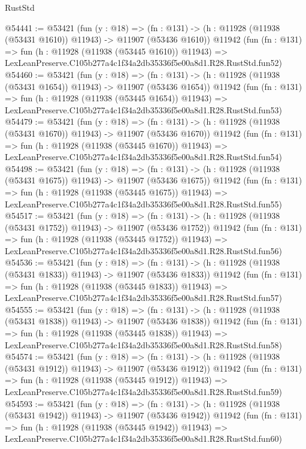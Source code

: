 \begin{lexlean}{RustStd}
\begin{coremodule}
@54441 := @53421
    (fun (y : @18) =>
    (fn : @131) -> (h : @11928 (@11938 (@53431 @1610)) @11943) -> @11907 (@53436 @1610))
    @11942
    (fun (fn : @131) =>
    fun (h : @11928 (@11938 (@53445 @1610)) @11943) =>
    LexLeanPreserve.C105b277a4c1f34a2db35336f5e00a8d1.R28.RustStd.fun52)
@54460 := @53421
    (fun (y : @18) =>
    (fn : @131) -> (h : @11928 (@11938 (@53431 @1654)) @11943) -> @11907 (@53436 @1654))
    @11942
    (fun (fn : @131) =>
    fun (h : @11928 (@11938 (@53445 @1654)) @11943) =>
    LexLeanPreserve.C105b277a4c1f34a2db35336f5e00a8d1.R28.RustStd.fun53)
@54479 := @53421
    (fun (y : @18) =>
    (fn : @131) -> (h : @11928 (@11938 (@53431 @1670)) @11943) -> @11907 (@53436 @1670))
    @11942
    (fun (fn : @131) =>
    fun (h : @11928 (@11938 (@53445 @1670)) @11943) =>
    LexLeanPreserve.C105b277a4c1f34a2db35336f5e00a8d1.R28.RustStd.fun54)
@54498 := @53421
    (fun (y : @18) =>
    (fn : @131) -> (h : @11928 (@11938 (@53431 @1675)) @11943) -> @11907 (@53436 @1675))
    @11942
    (fun (fn : @131) =>
    fun (h : @11928 (@11938 (@53445 @1675)) @11943) =>
    LexLeanPreserve.C105b277a4c1f34a2db35336f5e00a8d1.R28.RustStd.fun55)
@54517 := @53421
    (fun (y : @18) =>
    (fn : @131) -> (h : @11928 (@11938 (@53431 @1752)) @11943) -> @11907 (@53436 @1752))
    @11942
    (fun (fn : @131) =>
    fun (h : @11928 (@11938 (@53445 @1752)) @11943) =>
    LexLeanPreserve.C105b277a4c1f34a2db35336f5e00a8d1.R28.RustStd.fun56)
@54536 := @53421
    (fun (y : @18) =>
    (fn : @131) -> (h : @11928 (@11938 (@53431 @1833)) @11943) -> @11907 (@53436 @1833))
    @11942
    (fun (fn : @131) =>
    fun (h : @11928 (@11938 (@53445 @1833)) @11943) =>
    LexLeanPreserve.C105b277a4c1f34a2db35336f5e00a8d1.R28.RustStd.fun57)
@54555 := @53421
    (fun (y : @18) =>
    (fn : @131) -> (h : @11928 (@11938 (@53431 @1838)) @11943) -> @11907 (@53436 @1838))
    @11942
    (fun (fn : @131) =>
    fun (h : @11928 (@11938 (@53445 @1838)) @11943) =>
    LexLeanPreserve.C105b277a4c1f34a2db35336f5e00a8d1.R28.RustStd.fun58)
@54574 := @53421
    (fun (y : @18) =>
    (fn : @131) -> (h : @11928 (@11938 (@53431 @1912)) @11943) -> @11907 (@53436 @1912))
    @11942
    (fun (fn : @131) =>
    fun (h : @11928 (@11938 (@53445 @1912)) @11943) =>
    LexLeanPreserve.C105b277a4c1f34a2db35336f5e00a8d1.R28.RustStd.fun59)
@54593 := @53421
    (fun (y : @18) =>
    (fn : @131) -> (h : @11928 (@11938 (@53431 @1942)) @11943) -> @11907 (@53436 @1942))
    @11942
    (fun (fn : @131) =>
    fun (h : @11928 (@11938 (@53445 @1942)) @11943) =>
    LexLeanPreserve.C105b277a4c1f34a2db35336f5e00a8d1.R28.RustStd.fun60)

\end{coremodule}
\end{lexlean}
